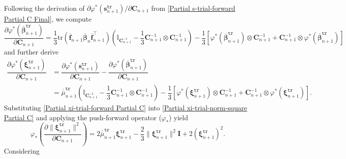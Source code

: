\documentclass[preprint,11pt]{elsarticle}
\theoremstyle{definition}
\begin{document}
Following the derivation of $\partial \varphi^* (\mathbf{s}_{n+1}^\texttt{tr}) / \partial \mathbf{C}_{n+1}$ from \eqref{Partial s-trial-forward Partial C Final}, we compute
\begin{equation*}
    \dfrac{\partial \varphi^*(\overline{\boldsymbol{\beta}}_{n+1}^\texttt{tr})}{\partial \mathbf{C}_{n+1}}
    = \dfrac{1}{3}\text{tr} \left( \overline{\mathbf{f}}_{n+1} \overline{\boldsymbol{\beta}}_n \overline{\mathbf{f}}_{n+1}^\top \right)
    \left( \mathbb{I}_{\mathbf{C}_{n+1}^{-1}} - \dfrac{1}{3} \mathbf{C}_{n+1}^{-1} \otimes \mathbf{C}_{n+1}^{-1} \right)
    - \dfrac{1}{3} \left[ \varphi^* \left( \overline{\boldsymbol{\beta}}_{n+1}^\texttt{tr} \right) \otimes \mathbf{C}_{n+1}^{-1}
    + \mathbf{C}_{n+1}^{-1} \otimes \varphi^* \left( \overline{\boldsymbol{\beta}}_{n+1}^\texttt{tr} \right) \right]
\end{equation*}
and further derive
\begin{equation} \label{Partial xi-trial-forward Partial C}
    \begin{array}{ll}
        \dfrac{\partial \varphi^*(\boldsymbol{\xi}_{n+1}^\texttt{tr})}{\partial \mathbf{C}_{n+1}} &= \dfrac{\partial \varphi^*(\mathbf{s}_{n+1}^\texttt{tr})}{\partial \mathbf{C}_{n+1}} -\dfrac{\partial \varphi^*(\overline{\boldsymbol{\beta}}_{n+1}^\texttt{tr})}{\partial \mathbf{C}_{n+1}} \\[12pt]
        &= \overline{\overline{\mu}}_{n+1}^\texttt{tr} \left( \mathbb{I}_{\mathbf{C}_{n+1}^{-1}} - \dfrac{1}{3} \mathbf{C}_{n+1}^{-1} \otimes \mathbf{C}_{n+1}^{-1} \right) - \dfrac{1}{3} \left[ \varphi^* \left( \boldsymbol{\xi}_{n+1}^\texttt{tr} \right) \otimes \mathbf{C}_{n+1}^{-1}
        + \mathbf{C}_{n+1}^{-1} \otimes \varphi^* \left( \boldsymbol{\xi}_{n+1}^\texttt{tr} \right) \right].
    \end{array}
\end{equation}
Substituting \eqref{Partial xi-trial-forward Partial C} into \eqref{Partial xi-trial-norm-square Partial C} and applying the push-forward operator ($\varphi_*$) yield
\begin{equation*}
    \varphi_* \left( \dfrac{\partial \lVert \boldsymbol{\xi}_{n+1}^\texttt{tr} \rVert^2}{\partial \mathbf{C}_{n+1}} \right)
    = 2 \overline{\overline{\mu}}_{n+1}^\texttt{tr} \boldsymbol{\xi}_{n+1}^\texttt{tr}
    - \dfrac{2}{3} \lVert \boldsymbol{\xi}_{n+1}^\texttt{tr} \rVert^2 \mathbf{I}
    + 2 \left( \boldsymbol{\xi}_{n+1}^\texttt{tr} \right)^2.
\end{equation*}
Considering
\end{document}
